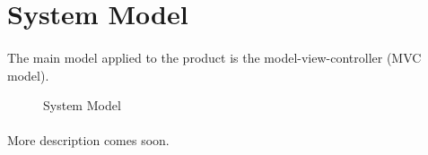 \section{System Model}
\paragraph{}The main model applied to the product is the
model-view-controller (MVC model).

\begin{figure}[h!]
\centering
\caption{System Model}
\end{figure}



\paragraph{}More description comes soon.